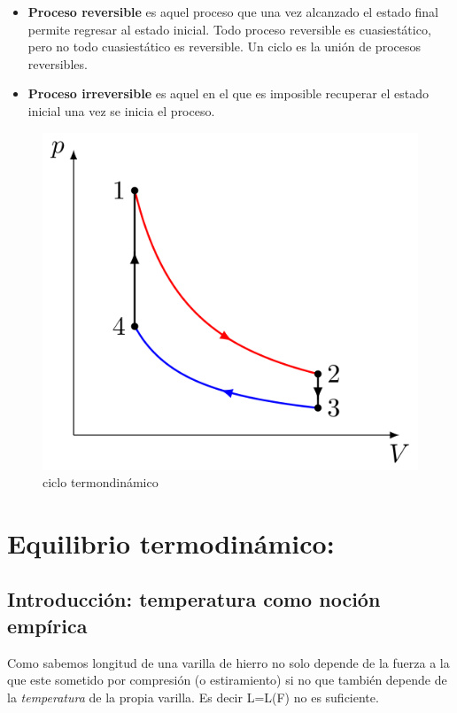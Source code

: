 \documentclass[12pt,a4paper]{article}
\begin{document}
\begin{itemize}
\item \textbf{Proceso reversible} es aquel proceso que una vez alcanzado el estado final permite regresar al estado inicial. Todo proceso reversible es cuasiestático, pero no todo cuasiestático es reversible. Un ciclo es la unión de procesos reversibles.

\item  \textbf{Proceso irreversible} es aquel en el que es imposible recuperar el estado inicial una vez se inicia el proceso.  
\end{itemize}

\begin{figure}[h!]
\centering \includegraphics[scale=0.25]{Ciclo-termodinamico.png}
\caption{ciclo termondinámico}
\end{figure}

\newpage
\section{Equilibrio termodinámico:}



\subsection{Introducción: temperatura como noción empírica}
Como sabemos longitud de una varilla de hierro no solo depende de la fuerza a la que este sometido por compresión (o estiramiento) si no que también depende de la \textit{temperatura} de la propia varilla. Es decir L=L(F) no es suficiente. \\
\end{document}

